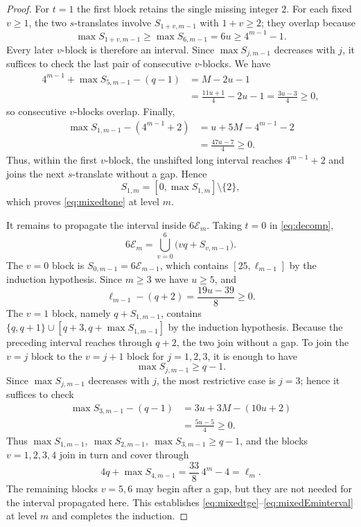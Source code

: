 \documentclass[12pt]{article}
\theoremstyle{plain}
\begin{document}
\begin{proof}
For $t=1$ the first block retains the single missing integer $2$.  For
each fixed $v\geq1$, the two $s$-translates involve $S_{1+v,m-1}$ with
$1+v\geq2$; they overlap because
\[
 \max S_{1+v,m-1}\geq\max S_{6,m-1}=6u\geq4^{m-1}-1.
\]
Every later $v$-block is therefore an interval.  Since $\max S_{j,m-1}$
decreases with $j$, it suffices to check the last pair of consecutive
$v$-blocks.  We have
\[
\begin{aligned}
 4^{m-1}+\max S_{5,m-1}-(q-1)
 &=M-2u-1\\
 &=\frac{11u+1}{4}-2u-1
  =\frac{3u-3}{4}\geq0,
\end{aligned}
\]
so consecutive $v$-blocks overlap.  Finally,
\[
\begin{aligned}
 \max S_{1,m-1}-(4^{m-1}+2)
 &=u+5M-4^{m-1}-2\\
 &=\frac{47u-7}{4}\geq0.
\end{aligned}
\]
Thus, within the first $v$-block, the unshifted long interval reaches
$4^{m-1}+2$ and joins the next $s$-translate without a gap.  Hence
\[
 S_{1,m}=[0,\max S_{1,m}]\setminus\{2\},
\]
which proves \eqref{eq:mixedtone} at level $m$.

It remains to propagate the interval inside $6\mathcal E_{m}$.  Taking
$t=0$ in \eqref{eq:decomp},
\[
 6\mathcal E_{m}=\bigcup_{v=0}^{6}\bigl(vq+S_{v,m-1}\bigr).
\]
The $v=0$ block is $S_{0,m-1}=6\mathcal E_{m-1}$, which contains
$[25,\ell_{m-1}]$ by the induction hypothesis.  Since $m\geq3$ we have
$u\geq5$, and
\[
 \ell_{m-1}-(q+2)=\frac{19u-39}{8}\geq0 .
\]
The $v=1$ block, namely $q+S_{1,m-1}$, contains
$\{q,q+1\}\cup[q+3,q+\max S_{1,m-1}]$ by the induction hypothesis.
Because the preceding interval reaches through $q+2$, the two join
without a gap.  To join the $v=j$ block to the $v=j+1$ block for
$j=1,2,3$, it is enough to have
\[
 \max S_{j,m-1}\geq q-1.
\]
Since $\max S_{j,m-1}$ decreases with $j$, the most restrictive case is
$j=3$; hence it suffices to check
\[
\begin{aligned}
 \max S_{3,m-1}-(q-1)
 &=3u+3M-(10u+2)\\
 &=\frac{5u-5}{4}\geq0 .
\end{aligned}
\]
Thus $\max S_{1,m-1},\ \max S_{2,m-1},\ \max S_{3,m-1}\geq q-1$, and
the blocks $v=1,2,3,4$ join in turn and cover through
\[
 4q+\max S_{4,m-1}=\frac{33}{8}\,4^m-4=\ell_{m} .
\]
The remaining blocks $v=5,6$ may begin after a gap, but they are not
needed for the interval propagated here.  This establishes
\eqref{eq:mixedtge}--\eqref{eq:mixedEminterval} at level $m$ and
completes the induction.
\end{proof}
\end{document}
